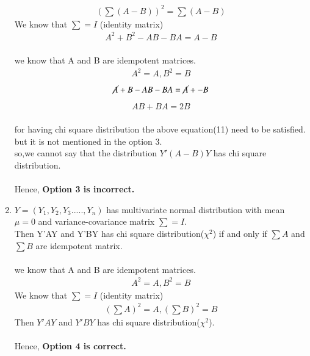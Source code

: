 \documentclass[journal,12pt,twocolumn]{IEEEtran}
\begin{document}
\begin{enumerate}
  \begin{align}
 (\textstyle \sum(A-B))^2=\sum(A-B) 
  \end{align}
   We know that $\sum=I$ (identity matrix)
    \begin{align}
 A^2+B^2-AB-BA=A-B 
  \end{align}
  \\we know that A and B are idempotent matrices.
    \begin{align}
 A^2=A ,B^2=B 
  \end{align}
   \begin{align}
 \cancel{A}+{B}-AB-BA=\cancel{A}+{-B}
  \end{align}
  \begin{align}
 AB+BA=2B
  \end{align}
  \\for having chi square distribution the above equation(11) need to be satisfied.\\
  but it is not mentioned in the option 3.\\
  so,we cannot say that the distribution $Y'(A-B)Y$ has chi square distribution.\\
   \\ Hence, \textbf{Option 3 is incorrect.}\\
 \item
 $Y=(Y_1,Y_2,Y_3.....,Y_n)$ has multivariate normal distribution with mean $\mu=0$ and variance-covariance matrix $\sum=I$.\\
 Then Y'AY and Y'BY has chi square distribution($\chi^2$)  if and only if $\sum A$ and $\sum B$ are idempotent matrix.\\
 \\we know that A and B are idempotent matrices.
  \begin{align}
 A^2=A ,B^2=B  
  \end{align}
  We know that $\sum=I$ (identity matrix)
  \begin{align}
 (\textstyle \sum  A)^2=A ,(\textstyle \sum B)^2=B 
  \end{align}
 Then $Y'AY$ and $Y'BY$ has chi square distribution($\chi^2$).\\
\\Hence, \textbf{Option 4 is correct.}
 \end{enumerate}
\end{document}
